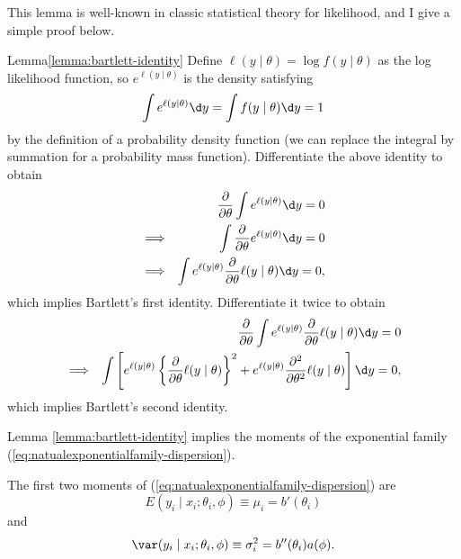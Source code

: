 This lemma is well-known in classic statistical theory for likelihood,
and I give a simple proof below.

\begin{myproof}{Lemma}{\ref{lemma:bartlett-identity}}
Define $\ell (y\mid \theta) = \log f(y\mid \theta)$ as the log likelihood function, so $e^{\ell (y\mid \theta)}$ is the density satisfying 
$$
\int e^{\ell (y\mid \theta)} \d y  = \int f(y\mid \theta)\d y = 1
$$
by the definition of a probability density function (we can replace the integral by summation for a probability mass function). Differentiate the above identity to obtain
\begin{eqnarray*}
&& \frac{\partial }{\partial \theta} \int e^{\ell (y\mid \theta)} \d y = 0 \\
 &\Longrightarrow  &   \int  \frac{\partial }{\partial \theta} e^{\ell (y\mid \theta)} \d y = 0 \\
 & \Longrightarrow  &   \int  e^{\ell (y\mid \theta)} \frac{\partial }{\partial \theta} \ell (y\mid \theta)  \d y = 0 ,
\end{eqnarray*}
which implies Bartlett's first identity. 
Differentiate it twice to obtain
\begin{eqnarray*}
&& \frac{\partial }{\partial \theta}  \int  e^{\ell (y\mid \theta)} \frac{\partial }{\partial \theta} \ell (y\mid \theta)  \d y = 0 \\
&\Longrightarrow &  \int  \left[ e^{\ell (y\mid \theta)} \left\{ \frac{\partial }{\partial \theta} \ell (y\mid \theta) \right\}^2  
+e^{\ell (y\mid \theta)} \frac{\partial^2 }{\partial \theta^2} \ell (y\mid \theta) \right] 
   \d y = 0 ,
\end{eqnarray*}
which implies Bartlett's second identity. 
\end{myproof}




Lemma \ref{lemma:bartlett-identity}
implies the moments of the exponential family (\ref{eq:natualexponentialfamily-dispersion}).
\begin{theorem}
\label{theorem:The-first-two-moments-NEF}The first two moments of (\ref{eq:natualexponentialfamily-dispersion})
are
$$
E(y_{i}\mid x_{i};\theta_{i},\phi)\equiv\mu_{i}=b'(\theta_{i})
$$
and
$$
\var(y_{i}\mid x_{i};\theta_{i},\phi)\equiv\sigma_{i}^{2}=b''(\theta_{i})a(\phi).
$$ 
\end{theorem}




